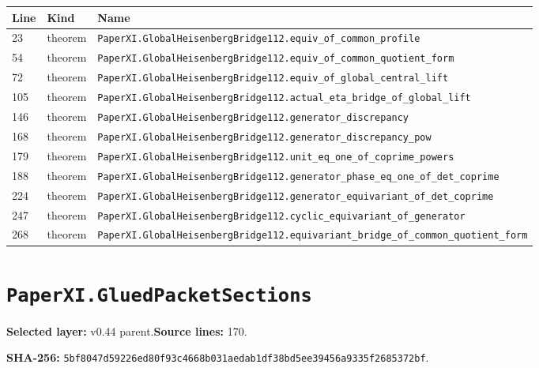 \documentclass[10pt,oneside]{book}
\begin{document}
\begin{longtable}{@{}p{}p{}p{}@{}}\toprule Line&Kind&Name\\\midrule\endhead

23&theorem&\nolinkurl{PaperXI.GlobalHeisenbergBridge112.equiv_of_common_profile}\\

54&theorem&\nolinkurl{PaperXI.GlobalHeisenbergBridge112.equiv_of_common_quotient_form}\\

72&theorem&\nolinkurl{PaperXI.GlobalHeisenbergBridge112.equiv_of_global_central_lift}\\

105&theorem&\nolinkurl{PaperXI.GlobalHeisenbergBridge112.actual_eta_bridge_of_global_lift}\\

146&theorem&\nolinkurl{PaperXI.GlobalHeisenbergBridge112.generator_discrepancy}\\

168&theorem&\nolinkurl{PaperXI.GlobalHeisenbergBridge112.generator_discrepancy_pow}\\

179&theorem&\nolinkurl{PaperXI.GlobalHeisenbergBridge112.unit_eq_one_of_coprime_powers}\\

188&theorem&\nolinkurl{PaperXI.GlobalHeisenbergBridge112.generator_phase_eq_one_of_det_coprime}\\

224&theorem&\nolinkurl{PaperXI.GlobalHeisenbergBridge112.generator_equivariant_of_det_coprime}\\

247&theorem&\nolinkurl{PaperXI.GlobalHeisenbergBridge112.cyclic_equivariant_of_generator}\\

268&theorem&\nolinkurl{PaperXI.GlobalHeisenbergBridge112.equivariant_bridge_of_common_quotient_form}\\

\bottomrule\end{longtable}

\section{\texorpdfstring{\nolinkurl{PaperXI.GluedPacketSections}}{PaperXI.GluedPacketSections}}\label{module:PaperXI.GluedPacketSections}

\textbf{Selected layer:} v0.44 parent.\quad\textbf{Source lines:} 170.\par\textbf{SHA-256:} {\scriptsize\nolinkurl{5bf8047d59226ed80f93c4668b031aedab1df38bd5ee39456a9335f2685372bf}}.
\end{document}
